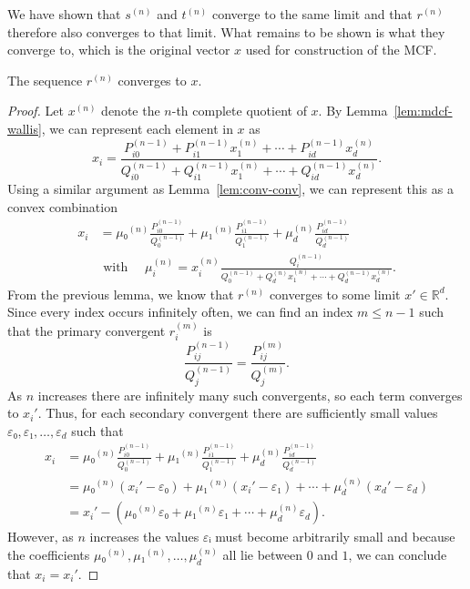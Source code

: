 We have shown that $s^{(n)}$ and $t^{(n)}$ converge to the same limit
and that $r^{(n)}$ therefore also converges to that limit.
What remains to be shown is what they converge to,
which is the original vector $x$ used for construction of the MCF.

\begin{theorem}
  \label{thm:mdcf-conv}
  The sequence $r^{(n)}$ converges to $x$.
\end{theorem}

\begin{proof}
  Let $x^{(n)}$ denote the $n$-th complete quotient of $x$.
  By Lemma~\ref{lem:mdcf-wallis}, we can represent each element in $x$ as
  \[
    x_i = \frac{P_{i0}^{(n-1)} + P_{i1}^{(n-1)} x_1^{(n)} + ⋯ + P_{id}^{(n-1)} x_d^{(n)}}{Q_{i0}^{(n-1)} + Q_{i1}^{(n-1)} x_1^{(n)} + ⋯ + Q_{id}^{(n-1)} x_d^{(n)}}.
  \]
  Using a similar argument as Lemma~\ref{lem:conv-conv}, we can represent this
  as a convex combination
  \begin{align*}
    x_i & = μ₀^{(n)} \frac{P_{i0}^{(n-1)}}{Q_0^{(n-1)}}  + μ₁^{(n)} \frac{P_{i1}^{(n-1)}}{Q_1^{(n-1)}} + μ_d^{(n)} \frac{P_{id}^{(n-1)}}{Q_d^{(n-1)}}
    \\
    &
    \text{ with }
    \quad
    μ_i^{(n)} = x_i^{(n)} \frac{Q_i^{(n-1)}}{Q_0^{(n-1)} + Q_d^{(n)} x_1^{(n)} + ⋯ + Q_d^{(n-1)} x_d^{(n)}}.
  \end{align*}
  From the previous lemma, we know that $r^{(n)}$ converges to some limit $x' ∈ ℝ^d$.
  Since every index occurs infinitely often,
  we can find an index $m ≤ n - 1$ such that the primary convergent $r_i^{(m)}$ is
  \[
    \frac{P_{ij}^{(n-1)}}{Q_j^{(n-1)}} = \frac{P_{ij}^{(m)}}{Q_j^{(m)}}.
  \]
  As $n$ increases there are infinitely many such convergents, so each term converges to $x_i'$.
  Thus, for each secondary convergent there are sufficiently small values $ε₀, ε₁, …, ε_d$ such that
  \begin{align*}
    x_i
    & = μ₀^{(n)} \frac{P_{i0}^{(n-1)}}{Q_0^{(n-1)}}  + μ₁^{(n)} \frac{P_{i1}^{(n-1)}}{Q_1^{(n-1)}} + μ_d^{(n)} \frac{P_{id}^{(n-1)}}{Q_d^{(n-1)}} \\
    & = μ₀^{(n)} (x_i' - ε₀) + μ₁^{(n)} (x_i' - ε₁) + ⋯ + μ_d^{(n)} (x_d' - ε_d) \\
    & = x_i' - (μ₀^{(n)} ε₀ + μ₁^{(n)} ε₁ + ⋯ + μ_d^{(n)} ε_d).
  \end{align*}
  However, as $n$ increases the values $εᵢ$ must become arbitrarily small
  and because the coefficients $μ₀^{(n)}, μ₁^{(n)}, …, μ_d^{(n)}$ all lie between $0$ and $1$,
  we can conclude that $x_i = x_i'$.
\end{proof}

